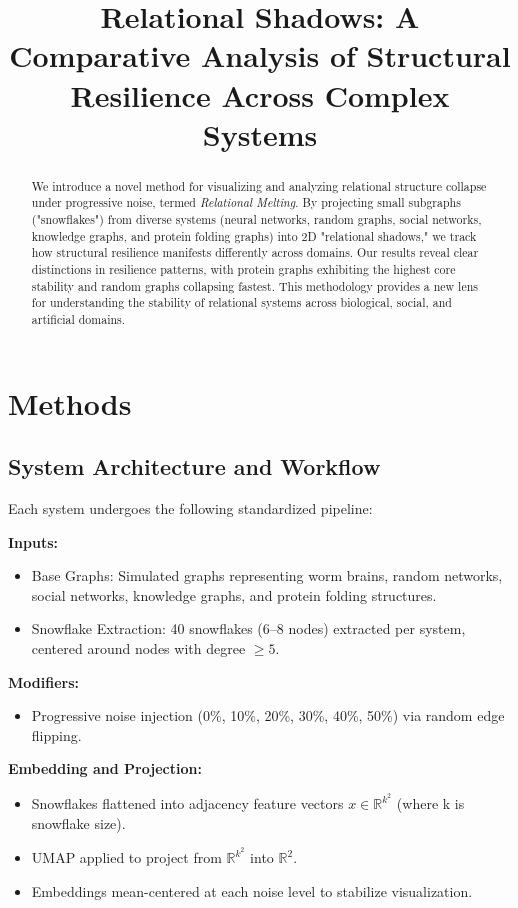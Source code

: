 \documentclass[conference]{IEEEtran}
\title{Relational Shadows: A Comparative Analysis of Structural Resilience Across Complex Systems}
\author{
    \IEEEauthorblockN{Elijah Lucas}
    \IEEEauthorblockA{Independent Researcher \\
    Email: your.email@example.com}
}
\begin{document}
\maketitle

\begin{abstract}
We introduce a novel method for visualizing and analyzing relational structure collapse under progressive noise, termed \textit{Relational Melting}. By projecting small subgraphs ("snowflakes") from diverse systems (neural networks, random graphs, social networks, knowledge graphs, and protein folding graphs) into 2D "relational shadows," we track how structural resilience manifests differently across domains. Our results reveal clear distinctions in resilience patterns, with protein graphs exhibiting the highest core stability and random graphs collapsing fastest. This methodology provides a new lens for understanding the stability of relational systems across biological, social, and artificial domains.
\end{abstract}

\section{Methods}

\subsection{System Architecture and Workflow}
Each system undergoes the following standardized pipeline:

\textbf{Inputs:}
\begin{itemize}
    \item Base Graphs: Simulated graphs representing worm brains, random networks, social networks, knowledge graphs, and protein folding structures.
    \item Snowflake Extraction: 40 snowflakes (6–8 nodes) extracted per system, centered around nodes with degree $\geq 5$.
\end{itemize}

\textbf{Modifiers:}
\begin{itemize}
    \item Progressive noise injection (0\%, 10\%, 20\%, 30\%, 40\%, 50\%) via random edge flipping.
\end{itemize}

\textbf{Embedding and Projection:}
\begin{itemize}
    \item Snowflakes flattened into adjacency feature vectors $x \in \mathbb{R}^{k^2}$ (where k is snowflake size).
    \item UMAP applied to project from $\mathbb{R}^{k^2}$ into $\mathbb{R}^{2}$.
    \item Embeddings mean-centered at each noise level to stabilize visualization.
\end{itemize}
\end{document}
